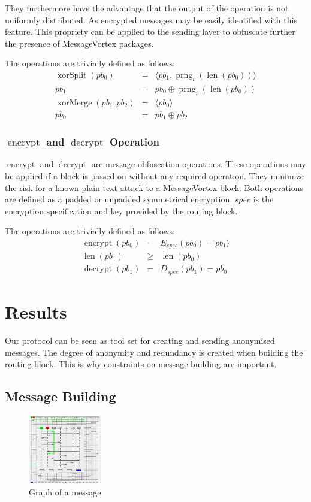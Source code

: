 \documentclass[9pt,journal,compsoc]{IEEEtran}
\DeclareMathOperator{\prng}{prng}
\DeclareMathOperator{\len}{len}
\DeclareMathOperator{\xorSplit}{xorSplit}
\DeclareMathOperator{\xorMerge}{xorMerge}
\DeclareMathOperator{\encrypt}{encrypt}
\DeclareMathOperator{\decrypt}{decrypt}
\begin{document}
They furthermore have the advantage that the output of the operation is not uniformly distributed. As encrypted messages may be easily identified with this feature. This propriety can be applied to the sending layer to obfuscate further the presence of MessageVortex packages.

The operations are trivially defined as follows:
\begin{eqnarray}
\xorSplit(pb_0) & = &\langle pb_1, \prng_i(\len(pb_0)) \rangle\\
pb_1 & = & pb_0 \oplus \prng_i(\len(pb_0))\\
\xorMerge(pb_1,pb_2) & = &\langle pb_0 \rangle\\
pb_0 & = & pb_1 \oplus pb_2
\end{eqnarray}

\subsubsection{$\encrypt$ and $\decrypt$ Operation}
$\encrypt$ and $\decrypt$ are message obfuscation operations. These operations may be applied if a block is passed on without any required operation. They minimize the risk for a known plain text attack to a MessageVortex block. Both operations are defined as a padded or unpadded symmetrical encryption. $spec$ is the encryption specification and key provided by the routing block.

The operations are trivially defined as follows:
\begin{eqnarray}
\encrypt(pb_0) & = &E_{spec}(pb_0) =pb_1 \rangle\\
\len(pb_1) & \geq & \len(pb_0)\\
\decrypt(pb_1) & = &D_{spec}(pb_1)= pb_0
\end{eqnarray}

\section{Results}
Our protocol can be seen as tool set for creating and sending anonymised messages. The degree of anonymity and redundancy is created when building the routing block. This is why constraints on message building are important.

\subsection{Message Building}
\begin{figure}[!t]
	\centering
	\includegraphics[width=\columnwidth,height=3cm]{msgGraph3}
	\caption{Graph of a message}
	\label{fig:mgsGraph}
\end{figure}
\end{document}
